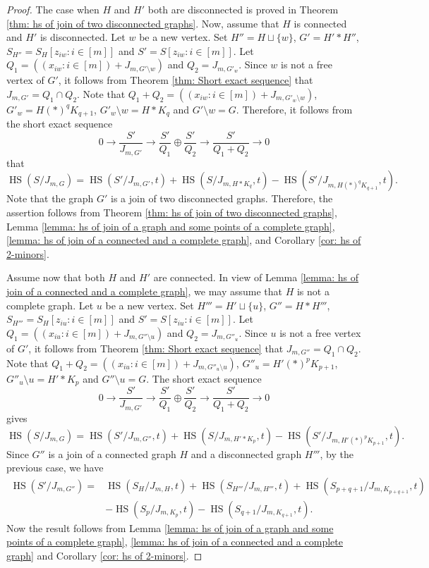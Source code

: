 \documentclass[12pt,reqno]{amsart}
\newcommand \hs{\operatorname{HS}}
\theoremstyle{plain}
\theoremstyle{definition}
\begin{document}
 \begin{proof}
    The case when $H$ and $H'$ both are disconnected is proved in Theorem \ref{thm: hs of join of two disconnected graphs}. Now, assume that $H$ is connected and $H'$ is disconnected. Let $w$ be a new vertex. Set $H''=H\sqcup \{w\}$, $G'=H'*H''$, $S_{H''}=S_H[z_{iw}:i\in [m]]$ and $S'=S[z_{iw}:i\in [m]]$. Let $Q_1=\left ((x_{iw}:i\in [m])+J_{m,G'\setminus w}\right )$ and $Q_2=J_{m,G'_w}$. Since $w$ is not a free vertex of $G'$, it follows from Theorem \ref{thm: Short exact sequence} that $J_{m,G'}=Q_1\cap Q_2$. Note that $Q_1+Q_2=\left ((x_{iw}:i\in [m])+J_{m,G'_w\setminus w}\right )$, $G'_w=H(*)^qK_{q+1}$, $G'_w\setminus w=H*K_q$ and $G'\setminus w=G$. Therefore, it follows from the short exact sequence \[ 0\rightarrow{\frac{S'}{J_{m,G'}}}\rightarrow \frac{S'}{Q_1}\oplus \frac{S'}{Q_2}\rightarrow \frac{S'}{Q_1+Q_2}\rightarrow 0\] that
     $$\hs(S/J_{m,G})=\hs(S'/J_{m,G'},t)+\hs(S/J_{m,H*K_q},t)-\hs(S'/J_{m,H(*)^qK_{q+1}},t).$$
     Note that the graph $G'$ is a join of two disconnected graphs. Therefore, the assertion follows from Theorem \ref{thm: hs of join of two disconnected graphs}, Lemma \ref{lemma: hs of join of a graph and some points of a complete graph}, \ref{lemma: hs of join of a connected and a complete graph}, and Corollary \ref{cor: hs of 2-minors}. 

     Assume now that both $H$ and $H'$ are connected. In view of Lemma \ref{lemma: hs of join of a connected and a complete graph}, we may assume that $H$ is not a complete graph. Let $u$ be a new vertex. Set $H'''=H'\sqcup \{u\}$, $G''=H*H'''$, $S_{H'''}=S_H[z_{iu}:i\in [m]]$ and $S'=S[z_{iu}:i\in [m]]$. Let $Q_1=\left ((x_{iu}:i\in [m])+J_{m,G''\setminus u}\right )$ and $Q_2=J_{m,G''_u}$. Since $u$ is not a free vertex of $G'$, it follows from Theorem \ref{thm: Short exact sequence} that $J_{m,G''}=Q_1\cap Q_2$. Note that $Q_1+Q_2=\left ((x_{iu}:i\in [m])+J_{m,G''_u\setminus u}\right )$, $G''_u=H'(*)^pK_{p+1}$, $G''_u\setminus u=H'*K_p$ and $G''\setminus u=G$. The short exact sequence \[ 0\rightarrow{\frac{S'}{J_{m,G'}}}\rightarrow \frac{S'}{Q_1}\oplus \frac{S'}{Q_2}\rightarrow \frac{S'}{Q_1+Q_2}\rightarrow 0\] gives $$\hs(S/J_{m,G})=\hs(S'/J_{m,G''},t)+\hs(S/J_{m,H'*K_p},t)-\hs(S'/J_{m,H'(*)^pK_{p+1}},t).$$ Since $G''$ is a join of a connected graph $H$ and a disconnected graph $H'''$, by the previous case, we have 
       \begin{align*}
\hs(S'/J_{m,G''})=&\hs(S_H/J_{m,H},t)+\hs(S_{H'''}/J_{m,H'''},t)+\hs(S_{p+q+1}/J_{m,K_{p+q+1}},t)\\
        &-\hs(S_p/J_{m,K_{p}},t)-\hs(S_{q+1}/J_{m,K_{q+1}},t).
    \end{align*}
    Now the result follows from Lemma \ref{lemma: hs of join of a graph and some points of a complete graph}, \ref{lemma: hs of join of a connected and a complete graph} and Corollary \ref{cor: hs of 2-minors}. 
 \end{proof}
\end{document}
